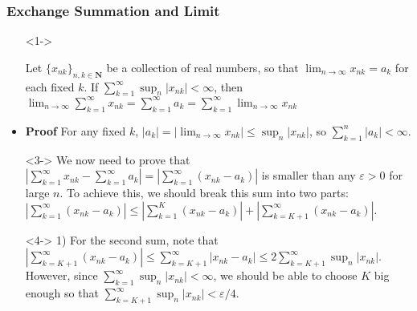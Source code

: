 \documentclass[handout]{beamer}
\begin{document}
\frame
{
  \frametitle{Exchange Summation and Limit}

   \begin{itemize}
   
      \item[]<1-> \begin{Theorem} Let $\{x_{nk}\}_{n,k\in\mathbf{N}}$ be a collection of real numbers, so that $\lim_{n\rightarrow \infty} x_{nk}=a_k$ for each fixed $k$. If $\sum_{k=1}^{\infty} \sup_n |x_{nk}|<\infty$, then $\lim_{n\rightarrow \infty } \sum_{k=1}^{\infty} x_{nk}=\sum_{k=1}^{\infty} a_k = \sum_{k=1}^{\infty} \lim_{n\rightarrow \infty } x_{nk}$\end{Theorem} 
 
  \item<2-> \textbf{Proof} For any fixed $k$, $|a_k|=|\lim_{n\rightarrow \infty} x_{nk}|  \leq \sup_n |x_{nk}|$, so $\sum_{k=1}^n |a_k|<\infty$.
  
  
  
     \item[]<3-> We now need to prove that $ |\sum_{k=1}^{\infty} x_{nk}- \sum_{k=1}^{\infty} a_k|=  |\sum_{k=1}^{\infty} ( x_{nk}- a_k)| $ is smaller than any $\varepsilon>0$ for large $n$. To achieve this, we should break this sum into two parts: $ |\sum_{k=1}^{\infty} ( x_{nk}- a_k)| \leq |\sum_{k=1}^{K} ( x_{nk}- a_k) |+|\sum_{k=K+1}^{\infty} ( x_{nk}- a_k)| $.
     
     \item[]<4-> 1) For the second sum, note that $|\sum_{k=K+1}^{\infty} ( x_{nk}- a_k)| \leq \sum_{k=K+1}^{\infty} | x_{nk}- a_k| \leq 2 \sum_{k=K+1}^{\infty} \sup_n |x_{nk}| $. However, since $\sum_{k=1}^{\infty} \sup_n |x_{nk}|<\infty$, we should be able to choose $K$ big enough so that $\sum_{k={K+1}}^{\infty} \sup_n |x_{nk}|<\varepsilon/4$.
     
    
 
       
  \end{itemize}
}
\end{document}
